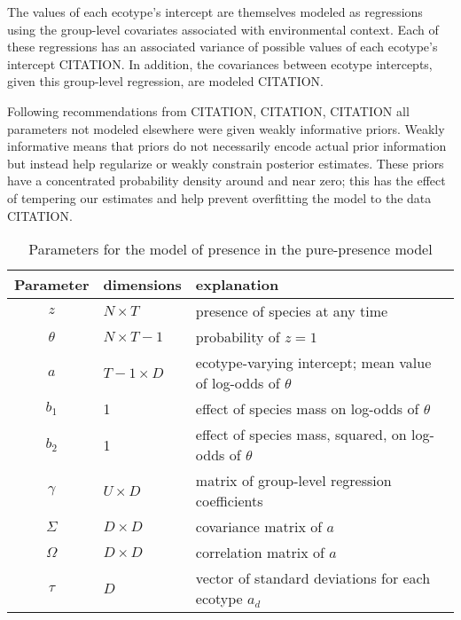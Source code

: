 \documentclass[12pt,letterpaper]{article}
\begin{document}
The values of each ecotype's intercept are themselves modeled as regressions using the group-level covariates associated with environmental context. Each of these regressions has an associated variance of possible values of each ecotype's intercept CITATION. In addition, the covariances between ecotype intercepts, given this group-level regression, are modeled CITATION.

Following recommendations from CITATION, CITATION, CITATION all parameters not modeled elsewhere were given weakly informative priors. Weakly informative means that priors do not necessarily encode actual prior information but instead help regularize or weakly constrain posterior estimates. These priors have a concentrated probability density around and near zero; this has the effect of tempering our estimates and help prevent overfitting the model to the data CITATION. 


\begin{table}
  \centering
  \caption{Parameters for the model of presence in the pure-presence model}
  \begin{tabular}{c l l}
    Parameter & dimensions & explanation \\
    \hline
    \(z\) & \(N \times T\) & presence of species at any time \\
    \(\theta\) & \(N \times T - 1\) & probability of \(z = 1\) \\
    \(a\) & \(T - 1 \times D\) & ecotype-varying intercept; mean value of log-odds of \(\theta\) \\
    \(b_{1}\) & 1 & effect of species mass on log-odds of \(\theta\) \\
    \(b_{2}\) & 1 & effect of species mass, squared, on log-odds of \(\theta\) \\
    \(\gamma\) & \(U \times D\) & matrix of group-level regression coefficients \\
    \(\Sigma\) & \(D \times D\) & covariance matrix of \(a\) \\
    \(\Omega\) & \(D \times D\) & correlation matrix of \(a\) \\
    \(\tau\) & \(D\) & vector of standard deviations for each ecotype \(a_{d}\) \\
  \end{tabular}
  \label{tab:pres_param}
\end{table}
\end{document}

